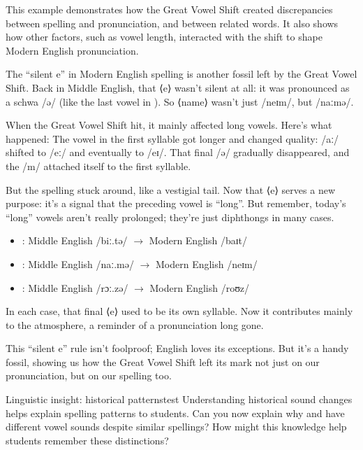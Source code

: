 This example demonstrates how the Great Vowel Shift created discrepancies between spelling and pronunciation, and between related words. It also shows how other factors, such as vowel length, interacted with the shift to shape Modern English pronunciation.

The \enquote{silent e} in Modern English spelling is another fossil left by the Great Vowel Shift. Back in Middle English, that ⟨e⟩ wasn't silent at all: it was pronounced as a schwa /ə/ (like the last vowel in ). So ⟨name⟩ wasn't just /neɪm/, but /naːmə/.

When the Great Vowel Shift hit, it mainly affected long vowels. Here's what happened: The vowel in the first syllable got longer and changed quality: /aː/ shifted to /eː/ and eventually to /eɪ/. That final /ə/ gradually disappeared, and the /m/ attached itself to the first syllable.

But the spelling stuck around, like a vestigial tail. Now that ⟨e⟩ serves a new purpose: it's a signal that the preceding vowel is \enquote{long}. But remember, today's \enquote{long} vowels aren't really prolonged; they're just diphthongs in many cases.

\begin{itemize}[noitemsep]
    \item {}: Middle English /biː.tə/ $\rightarrow$ Modern English /baɪt/
    \item {}: Middle English /naː.mə/ $\rightarrow$ Modern English /neɪm/
    \item {}: Middle English /rɔː.zə/ $\rightarrow$ Modern English /roʊz/
\end{itemize}

In each case, that final ⟨e⟩ used to be its own syllable. Now it contributes mainly to the atmosphere, a reminder of a pronunciation long gone.

This \enquote{silent e} rule isn't foolproof; English loves its exceptions. But it's a handy fossil, showing us how the Great Vowel Shift left its mark not just on our pronunciation, but on our spelling too.

\begin{tblsframedsymbol}{Linguistic insight: historical patterns}{test}
Understanding historical sound changes helps explain spelling patterns to students. Can you now explain why  and  have different vowel sounds despite similar spellings? How might this knowledge help students remember these distinctions?
\end{tblsframedsymbol}

